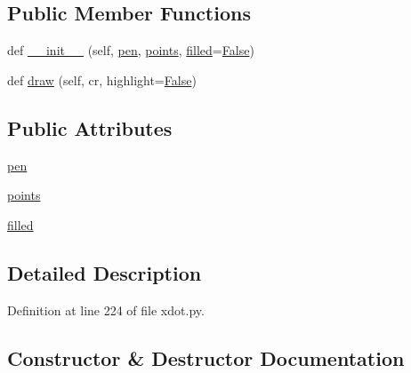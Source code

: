 \subsection*{Public Member Functions}
\begin{DoxyCompactItemize}
\item 
def \hyperlink{classsmacc__viewer_1_1xdot_1_1xdot_1_1PolygonShape_ac818e5f5517ae180267dec514e26deb2}{\+\_\+\+\_\+init\+\_\+\+\_\+} (self, \hyperlink{classsmacc__viewer_1_1xdot_1_1xdot_1_1PolygonShape_aa8dddefcc331a263a7e1eadcd1d9d8e1}{pen}, \hyperlink{classsmacc__viewer_1_1xdot_1_1xdot_1_1PolygonShape_a07211b47e692cdcc89d412db44fec2a7}{points}, \hyperlink{classsmacc__viewer_1_1xdot_1_1xdot_1_1PolygonShape_ac9db183c34593ef8b830cf2f06458720}{filled}=\hyperlink{namespacesmacc__viewer_a5928e8da279785cbab9011356c3eaa87}{False})
\item 
def \hyperlink{classsmacc__viewer_1_1xdot_1_1xdot_1_1PolygonShape_abb66a41371ac48799c85fdd4cca55e4e}{draw} (self, cr, highlight=\hyperlink{namespacesmacc__viewer_a5928e8da279785cbab9011356c3eaa87}{False})
\end{DoxyCompactItemize}
\subsection*{Public Attributes}
\begin{DoxyCompactItemize}
\item 
\hyperlink{classsmacc__viewer_1_1xdot_1_1xdot_1_1PolygonShape_aa8dddefcc331a263a7e1eadcd1d9d8e1}{pen}
\item 
\hyperlink{classsmacc__viewer_1_1xdot_1_1xdot_1_1PolygonShape_a07211b47e692cdcc89d412db44fec2a7}{points}
\item 
\hyperlink{classsmacc__viewer_1_1xdot_1_1xdot_1_1PolygonShape_ac9db183c34593ef8b830cf2f06458720}{filled}
\end{DoxyCompactItemize}


\subsection{Detailed Description}


Definition at line 224 of file xdot.\+py.



\subsection{Constructor \& Destructor Documentation}
